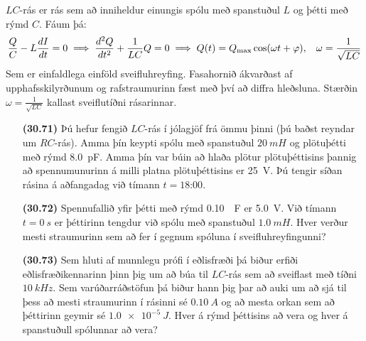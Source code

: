\begin{tcolorbox}
$LC$-rás er rás sem að inniheldur einungis spólu með spanstuðul $L$ og þétti með rýmd $C$. Fáum þá:
\begin{align*}
    \frac{Q}{C} - L \frac{dI}{dt} = 0 \implies \frac{d^2Q}{dt^2} + \frac{1}{LC} Q = 0 \implies Q(t) = Q_{\text{max}}\cos(\omega t + \varphi), \hspace{0.3cm} \omega = \frac{1}{\sqrt{LC}}
\end{align*}
Sem er einfaldlega einföld sveifluhreyfing. Fasahornið ákvarðast af upphafsskilyrðunum og rafstraumurinn fæst með því að diffra hleðsluna. Stærðin $\omega = \frac{1}{\sqrt{LC}}$ kallast sveiflutíðni rásarinnar.
\end{tcolorbox}

\begin{enumerate}[label = \textbf{(\alph*)}]

\item[\textbf{(30.71)}] Þú hefur fengið $LC$-rás í jólagjöf frá ömmu þinni (þú baðst reyndar um $RC$-rás). Amma þín keypti spólu með spanstuðul $\SI{20}{mH}$ og plötuþétti með rýmd \SI{8.0}{pF}. Amma þín var búin að hlaða plötur plötuþéttisins þannig að spennumunurinn á milli platna plötuþéttisins er \SI{25}{V}. Þú tengir síðan rásina á aðfangadag við tímann $t = \text{18:00}$. 

\item[\textbf{(30.72)}] Spennufallið yfir þétti með rýmd \SI{0.10}{\mu F} er \SI{5.0}{V}. Við tímann $t = \SI{0}{s}$ er þéttirinn tengdur við spólu með spanstuðul $\SI{1.0}{mH}$. Hver verður mesti straumurinn sem að fer í gegnum spóluna í sveifluhreyfingunni?

\item[\textbf{(30.73)}] Sem hluti af munnlegu prófi í eðlisfræði þá biður erfiði eðlisfræðikennarinn þinn þig um að búa til $LC$-rás sem að sveiflast með tíðni $\SI{10}{kHz}$. Sem varúðarráðstöfun þá biður hann þig þar að auki um að sjá til þess að mesti straumurinn í rásinni sé $\SI{0.10}{A}$ og að mesta orkan sem að þéttirinn geymir sé $\SI{1.0e-5}{J}$. Hver á rýmd þéttisins að vera og hver á spanstuðull spólunnar að vera?


\end{enumerate}
